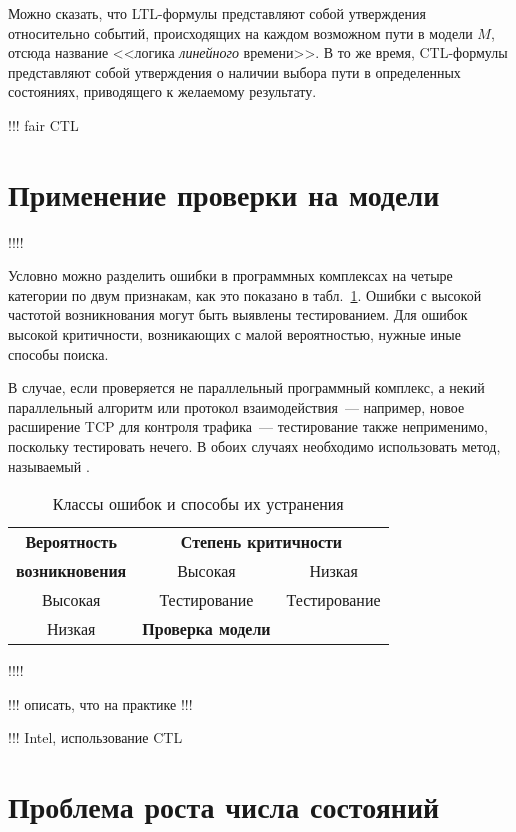 \documentclass[a4paper,notitlepage,14pt]{article}
\begin{document}
Можно сказать, что LTL-формулы представляют собой утверждения относительно событий,
происходящих на каждом возможном пути в модели $M$, отсюда название <<логика
\emph{линейного} времени>>. В то же время, CTL-формулы представляют собой утверждения о
наличии выбора пути в определенных состояниях, приводящего к желаемому результату.


!!! fair CTL

\section{Применение проверки на модели}
\label{sec:applications}

!!!!

Условно можно разделить ошибки в программных комплексах на четыре категории по двум признакам, как
это показано в табл.~\ref{tab:error-classes}. Ошибки с высокой частотой возникнования
могут быть выявлены тестированием. Для ошибок высокой критичности, возникающих с малой
вероятностью, нужные иные способы поиска.

В случае, если проверяется не параллельный программный комплекс, а некий параллельный
алгоритм или протокол взаимодействия~--- например, новое расширение TCP для контроля
трафика~--- тестирование также неприменимо, поскольку тестировать нечего. В обоих случаях
необходимо использовать метод, называемый .

\begin{table}[hb]
  \centering
  \caption{Классы ошибок и способы их устранения}
  \begin{tabular}{|c|c|c|} \hline
    \textbf{Вероятность} & \multicolumn{2}{|c|}{\bf Степень критичности} \\ \cline{2-3}
    \textbf{возникновения} & Высокая & Низкая \\ \hline
    Высокая & Тестирование & Тестирование \\  \hline
    Низкая  & \textbf{Проверка модели} &  \\  \hline
  \end{tabular}  
  \label{tab:error-classes}
\end{table}

!!!!

!!! описать, что на практике !!!

!!! Intel, использование CTL

\section{Проблема роста числа состояний}
\label{sec:state-explosion}
\end{document}
